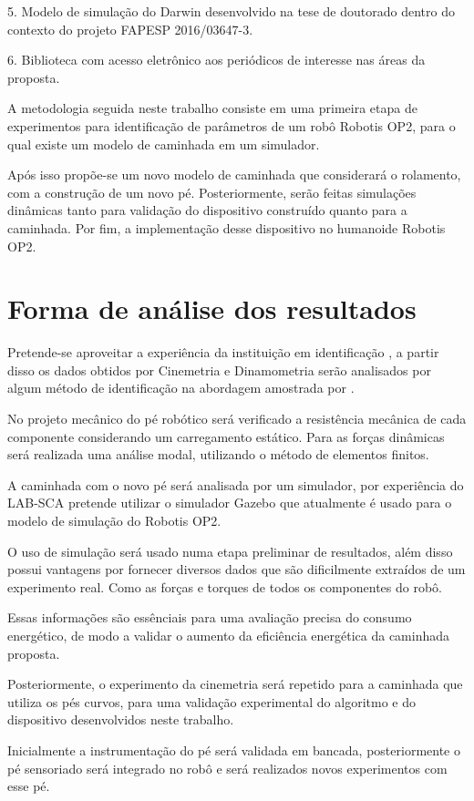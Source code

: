 5.	Modelo de simulação do Darwin desenvolvido na tese de doutorado dentro do contexto do projeto FAPESP 2016/03647-3.

6.	Biblioteca com acesso eletrônico aos periódicos de interesse nas áreas da proposta.



A metodologia seguida neste trabalho consiste em uma primeira etapa de experimentos para identificação de parâmetros de um robô Robotis OP2, para o qual existe um modelo de caminhada em um simulador.

Após isso propõe-se um novo modelo de caminhada que considerará o rolamento, com a construção de um novo pé. Posteriormente, serão feitas simulações dinâmicas tanto para validação do dispositivo construído quanto para a caminhada. Por fim, a implementação desse dispositivo no humanoide Robotis OP2.




\section{Forma de análise dos resultados}

Pretende-se aproveitar a experiência da instituição em identificação \cite{gripp}, a partir disso os dados obtidos por Cinemetria e Dinamometria serão analisados por algum método de identificação na abordagem amostrada por \cite{ident2014,ident2017}.

No projeto mecânico do pé robótico será verificado a resistência mecânica de cada componente considerando um carregamento estático. Para as forças dinâmicas será realizada uma análise modal, utilizando o método de elementos finitos.

A caminhada com o novo pé será analisada por um simulador, por experiência do LAB-SCA pretende utilizar o simulador Gazebo que atualmente é usado para o modelo de simulação do Robotis OP2.

O uso de simulação será usado numa etapa preliminar de resultados, além disso possui vantagens por fornecer diversos dados que são dificilmente extraídos de um experimento real. Como as forças e torques de todos os componentes do robô. 

Essas informações são essênciais para uma  avaliação precisa do consumo energético, de modo a validar o aumento da eficiência energética da caminhada proposta.

Posteriormente, o experimento da cinemetria será repetido para a caminhada que utiliza os pés curvos, para uma validação experimental do algoritmo e do dispositivo desenvolvidos neste trabalho.

Inicialmente a instrumentação do pé será validada em bancada, posteriormente o pé sensoriado será integrado no robô e será realizados novos experimentos com esse pé. 


\newpage



\printbibliography
